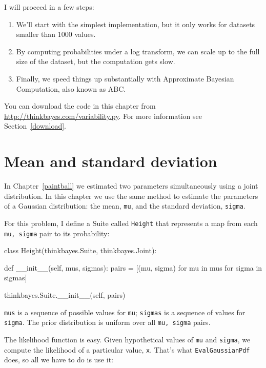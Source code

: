 \documentclass[12pt]{book}
\theoremstyle{exercise}
\begin{document}
I will proceed in a few steps:

\begin{enumerate}

\item We'll start with the simplest implementation, but it only works
  for datasets smaller than 1000 values.

\item By computing probabilities under a log transform, we can scale
  up to the full size of the dataset, but the computation gets slow.

\item Finally, we speed things up substantially with Approximate
  Bayesian Computation, also known as ABC.

\end{enumerate}

You can download the code in this chapter from
\url{http://thinkbayes.com/variability.py}.
  For more information
see Section~\ref{download}.

\section{Mean and standard deviation}

In Chapter~\ref{paintball} we estimated two parameters simultaneously
using a joint distribution.  In this chapter we use the same
method to estimate the parameters of a Gaussian distribution:
the mean, {\tt mu}, and the standard deviation, {\tt sigma}.

For this problem, I define a Suite called {\tt Height} that
represents a map from each {\tt mu, sigma} pair to its probability:

\begin{code}
class Height(thinkbayes.Suite, thinkbayes.Joint):

    def __init__(self, mus, sigmas):
        pairs = [(mu, sigma) 
                 for mu in mus
                 for sigma in sigmas]

        thinkbayes.Suite.__init__(self, pairs)
\end{code}

{\tt mus} is a sequence of possible values for {\tt mu}; {\tt sigmas}
is a sequence of values for {\tt sigma}.  The prior distribution
is uniform over all {\tt mu, sigma} pairs.

The likelihood function is easy.  Given hypothetical values
of {\tt mu} and {\tt sigma}, we compute the likelihood
of a particular value, {\tt x}.  That's what {\tt EvalGaussianPdf}
does, so all we have to do is use it:
\end{document}
